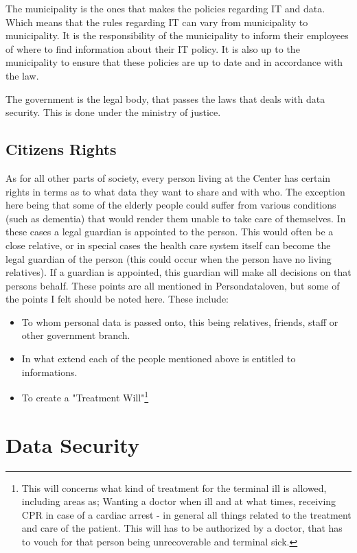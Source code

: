 \documentclass[11pt]{article}
\begin{document}
The municipality is the ones that makes the policies regarding IT and data. Which means that the rules regarding IT can vary from municipality to municipality. It is the responsibility of the municipality to inform their employees of where to find information about their IT policy. It is also up to the municipality to ensure that these policies are up to date and in accordance with the law.

The government is the legal body, that passes the laws that deals with data security. This is done under the ministry of justice.
\subsection{Citizens Rights}
As for all other parts of society, every person living at the Center has certain rights in terms as to what data they want to share and with who. The exception here being that some of the elderly people could suffer from various conditions (such as dementia) that would render them unable to take care of themselves. In these cases a legal guardian is appointed to the person. This would often be a close relative, or in special cases the health care system itself can become the legal guardian of the person (this could occur when the person have no living relatives). If a guardian is appointed, this guardian will make all decisions on that persons behalf. These points are all mentioned in Persondataloven, but some of the points I felt should be noted here.
These include:
\begin{itemize}
\item To whom personal data is passed onto, this being relatives, friends, staff or other government branch.
\item In what extend each of the people mentioned above is entitled to informations.
\item To create a "Treatment Will"\footnote{This will concerns what kind of treatment for the terminal ill is allowed, including areas as; Wanting a doctor when ill and at what times, receiving CPR in case of a 
cardiac arrest - in general all things related to the treatment and care of the patient. This will has to be authorized by a doctor, that has to vouch for that person being unrecoverable and terminal sick.}
\end{itemize}
\section{Data Security}
\end{document}
